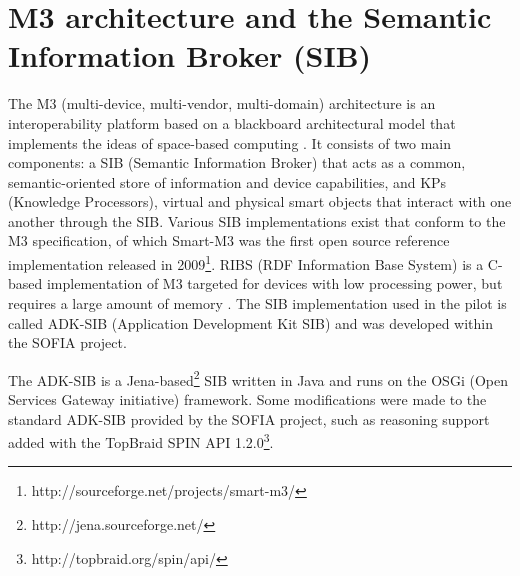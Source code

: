 
\section{M3 architecture and the Semantic Information Broker (SIB)}
\label{m3}
The M3 (multi-device, multi-vendor, multi-domain) architecture is an interoperability platform based on a blackboard architectural model that implements the ideas of space-based computing \cite{Honkola2010}. It consists of two main components: a SIB (Semantic Information Broker) that acts as a common, semantic-oriented store of information and device capabilities, and KPs (Knowledge Processors), virtual and physical smart objects that interact with one another through the SIB. Various SIB implementations exist that conform to the M3 specification, of which Smart-M3 was the first open source reference implementation released in 2009\footnote{http://sourceforge.net/projects/smart-m3/}. RIBS (RDF Information Base System) is a C-based implementation of M3 targeted for devices with low processing power, but requires a large amount of memory \cite{Etelapera2011}.  The SIB implementation used in the pilot is called ADK-SIB (Application Development Kit SIB) and was developed within the SOFIA project. 

The ADK-SIB is a Jena-based\footnote{http://jena.sourceforge.net/} SIB written in Java and runs on the OSGi (Open Services Gateway initiative) framework. Some modifications were made to the standard ADK-SIB provided by the SOFIA project, such as reasoning support added with the TopBraid SPIN API 1.2.0\footnote{http://topbraid.org/spin/api/}.



